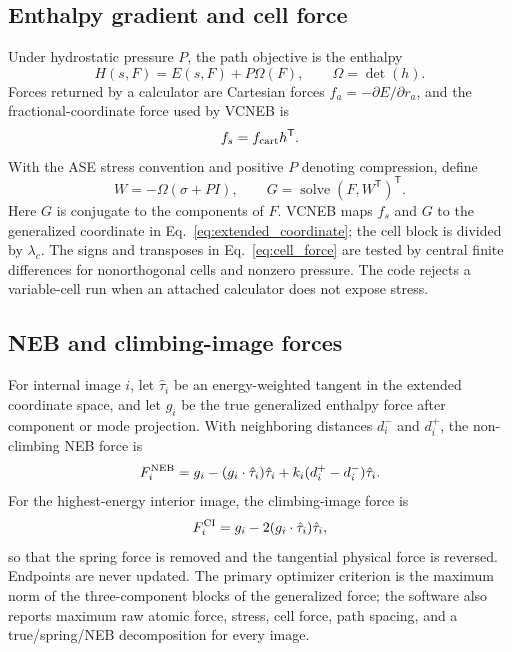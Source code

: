\documentclass[final,3p,times]{elsarticle}
\begin{document}
\subsection{Enthalpy gradient and cell force}

Under hydrostatic pressure $P$, the path objective is the enthalpy
\begin{equation}
  H(s,F)=E(s,F)+P\Omega(F),
  \qquad \Omega=\det(h).
  \label{eq:enthalpy}
\end{equation}
Forces returned by a calculator are Cartesian forces $f_a=-\partial E/\partial
r_a$, and the fractional-coordinate force used by VCNEB is
\begin{equation}
  f_s = f_{\rm cart} h^{\mathsf T}.
  \label{eq:fractional_force}
\end{equation}
With the ASE stress convention and positive $P$ denoting compression, define
\begin{equation}
  W=-\Omega(\sigma+PI), \qquad
  G=\operatorname{solve}(F,W^{\mathsf T})^{\mathsf T}.
  \label{eq:cell_force}
\end{equation}
Here $G$ is conjugate to the components of $F$.  VCNEB maps $f_s$ and $G$ to
the generalized coordinate in Eq.~\eqref{eq:extended_coordinate}; the cell
block is divided by $\lambda_c$.  The signs and transposes in
Eq.~\eqref{eq:cell_force} are tested by central finite differences for
nonorthogonal cells and nonzero pressure.  The code rejects a variable-cell
run when an attached calculator does not expose stress.

\subsection{NEB and climbing-image forces}

For internal image $i$, let $\hat\tau_i$ be an energy-weighted tangent in the
extended coordinate space, and let $g_i$ be the true generalized enthalpy
force after component or mode projection.  With neighboring distances
$d_i^-$ and $d_i^+$, the non-climbing NEB force is
\begin{equation}
  F_i^{\rm NEB} = g_i- (g_i\cdot\hat\tau_i)\hat\tau_i
       + k_i(d_i^+-d_i^-)\hat\tau_i .
  \label{eq:neb_force}
\end{equation}
For the highest-energy interior image, the climbing-image force is
\begin{equation}
  F_i^{\rm CI}=g_i-2(g_i\cdot\hat\tau_i)\hat\tau_i,
  \label{eq:ci_force}
\end{equation}
so that the spring force is removed and the tangential physical force is
reversed.  Endpoints are never updated.  The primary optimizer criterion is
the maximum norm of the three-component blocks of the generalized force; the
software also reports maximum raw atomic force, stress, cell force, path
spacing, and a true/spring/NEB decomposition for every image.
\end{document}
